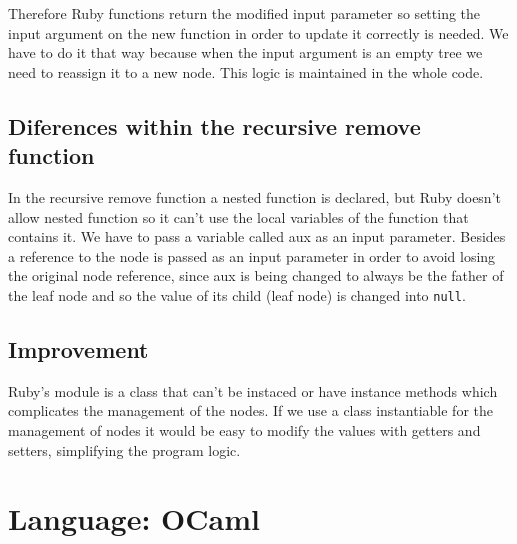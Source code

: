 \documentclass[11pt]{scrartcl} %
\begin{document}
	Therefore Ruby functions return the modified input parameter so setting the input argument on the new function in order to update it correctly is needed.
	We have to do it that way because when the input argument is an empty tree we need to reassign it to a new node. This logic is maintained in the whole code.
	
\subsection*{Diferences within the recursive remove function}

In the recursive remove function a nested function is declared, but Ruby doesn't allow nested function so it can't use the local variables of the function that contains it. We have to pass a variable called aux as an input parameter. Besides a reference to the node is passed as an input parameter in order to avoid losing the original node reference, since aux is being changed to always be the father of the leaf node and so the value of its child (leaf node) is changed into \texttt{null}.
 
\subsection*{Improvement}

Ruby's module is a class that can't be instaced or have instance methods which complicates the management of the nodes. If we use a class instantiable for the management of nodes it would be easy to modify the values with getters and setters, simplifying the program logic.

\section{Language: OCaml}
\end{document}

